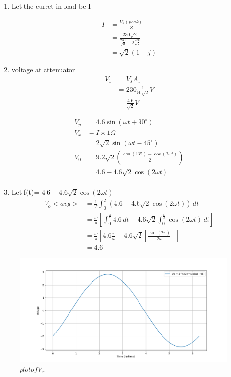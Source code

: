 \documentclass[journal,12pt,twocolumn]{IEEEtran}
\theoremstyle{remark}
\begin{document}
\solution
\fi

\begin{enumerate}
    \item 

Let the curret in load be I

\begin{center}
\begin{align}
     I &=\frac{V_s(peak)}{Z}\\
     &=\frac{230\sqrt{2}}{\frac{230}{\sqrt{2}}+j\frac{230}{\sqrt{2}}} \\
     &=\sqrt{2}(1-j)
\end{align}
\end{center}
\item
voltage at attenuator 
\begin{align}
    V_1&=V_sA_1\\
    &=230\frac{1}{50\sqrt{2}}V\\
    &=\frac{4.6}{\sqrt{2}}V
\end{align}

\begin{center}
    \begin{align}
        V_y&=4.6\sin(\omega t+90^\circ)\\
        V_x&=I\times 1\Omega\\
        &=2\sqrt{2}\sin(\omega t-45^\circ)\\
        V_0&=9.2\sqrt{2}(\frac{\cos(135)-\cos(2\omega t)}{2})\\
        &=4.6-4.6\sqrt{2}\cos(2\omega t)\\
    \end{align}
\end{center}

\item 
Let f(t)= $4.6-4.6\sqrt{2}\cos(2\omega t)$
\begin{align}
    V_o<avg>&=\frac{1}{T}\int_{0}^{T}(4.6-4.6\sqrt{2}\cos(2\omega t))\,dt\\
    &=\frac{\omega}{\pi} \left[\int_{0}^{\frac{\pi}{\omega}}4.6\,dt-4.6\sqrt{2}\int_{0}^{\frac{\pi}{\omega}}\cos(2\omega t)\,dt\right]\\
    &=\frac{\omega}{\pi}\left[4.6\frac{\pi}{\omega}-4.6\sqrt{2}\left[\frac{\sin(2\pi )}{2\omega}\right]\right]\\
    &=4.6
\end{align}
\end{enumerate}
\begin{figure}[h]
      \centering
       \includegraphics[width=1\linewidth]{2023/IN/61/figs/V_x.png} %
        \caption{$plot of V_x$}
\end{figure}
\end{document}

